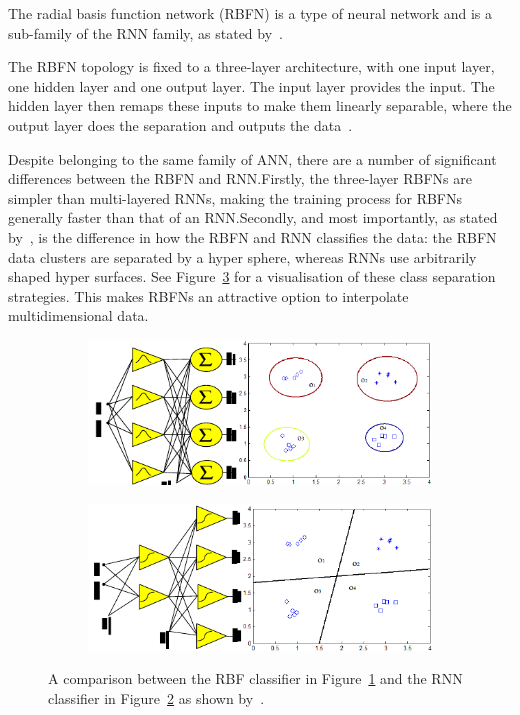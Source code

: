 The radial basis function network (RBFN) is a type of neural network and is a sub-family of the RNN family, as stated by~\cite{wilamowski1996implementation}. 

The RBFN topology is fixed to a three-layer architecture, with one input layer, one hidden layer and one output layer. The input layer provides the input. The hidden layer then remaps these inputs to make them linearly separable, where the output layer does the separation and outputs the data~\citep{xie2011comparison}.  

Despite belonging to the same family of ANN, there are a number of significant differences between the RBFN and RNN.\@ Firstly, the three-layer RBFNs are simpler than multi-layered RNNs, making the training process for RBFNs generally faster than that of an RNN.\@ Secondly, and most importantly, as stated by~\citeauthor{xie2011comparison}, is the difference in how the RBFN and RNN classifies the data: the RBFN data clusters are separated by a hyper sphere, whereas RNNs use arbitrarily shaped hyper surfaces. See Figure~\ref{fig:chap2-classifier} for a visualisation of these class separation strategies. This makes RBFNs an attractive option to interpolate multidimensional data.

\begin{figure}
  \centering
  \begin{subfigure}{0.5\textwidth}
    \includegraphics[width=\textwidth]{figures/chapter2/rbf_class}
    \caption{}
    \label{fig:chap2-rbf-classifier}
  \end{subfigure}
  \begin{subfigure}{0.5\textwidth}
    \includegraphics[width=\textwidth]{figures/chapter2/rnn_class}
    \caption{}
    \label{fig:chap2-rnn-classifier}
  \end{subfigure}
  \caption[A comparison between the RBF and RNN classifiers. ]{A comparison between the RBF classifier in Figure~\ref{fig:chap2-rbf-classifier} and the RNN classifier in Figure~\ref{fig:chap2-rnn-classifier} as shown by~\cite{xie2011comparison}. }
\label{fig:chap2-classifier}
\end{figure}

